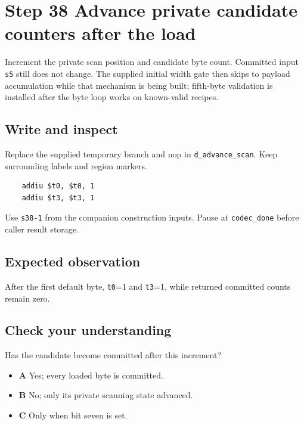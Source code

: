 \section{Step 38 Advance private candidate counters after the load}\label{delta-s38}

Increment the private scan position and candidate byte count. Committed input \texttt{s5} still does not change. The supplied initial width gate then skips to payload accumulation while that mechanism is being built; fifth-byte validation is installed after the byte loop works on known-valid recipes.

\subsection{Write and inspect}
Replace the supplied temporary branch and nop in \texttt{d\_advance\_scan}. Keep surrounding labels and region markers.

\begin{verbatim}
    addiu $t0, $t0, 1
    addiu $t3, $t3, 1
\end{verbatim}
Use \texttt{s38-1} from the companion construction inputs. Pause at \texttt{codec\_done} before caller result storage.

\subsection{Expected observation}
After the first default byte, \texttt{t0}=1 and \texttt{t3}=1, while returned committed counts remain zero.

\subsection{Check your understanding}
Has the candidate become committed after this increment?

\begin{itemize}
  \item \textbf{A} Yes; every loaded byte is committed.
  \item \textbf{B} No; only its private scanning state advanced.
  \item \textbf{C} Only when bit seven is set.
\end{itemize}
